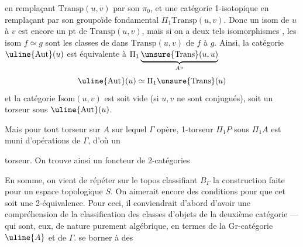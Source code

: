 
en remplaçant \(\mathrm{Transp}(u,v)\) par son \(\pi_0\), et une catégorie 1-isotopique en  remplaçant par son groupoïde fondamental \(\Pi_1\mathrm{Transp}(u,v)\). Donc un isom de \(u\) à \(v\) est encore un pt de \(\mathrm{Transp}(u,v)\), mais si on a deux tels isomorphismes , les isom \(f\simeq g\) sont les classes de  dans \(\mathrm{Transp}(u,v)\) de \(f\) à \(g\). Ainsi, la catégorie \(\uline{\mathrm{Aut}}(u)\) est équivalente à \(\Pi_1\underbrace{\unsure{\mathrm{Trans}}(u,u)}_{A^u}\) 
\[
\uline{\mathrm{Aut}}(u)\simeq\Pi_1\unsure{\mathrm{Trans}}(u)
\]
et la  catégorie \(\mathrm{Isom}(u,v)\) est soit vide (si \(u,v\) ne sont conjugués), soit un torseur sous \(\uline{\mathrm{Aut}}(u)\).

Mais pour tout torseur  sur \(A\) sur lequel \(\Gamma\) opère,   1-torseur  \(\Pi_1P\) sous \(\Pi_1A\)  est muni d'opérations de \(\Gamma\), d'où un


 torseur. On trouve ainsi un foncteur de 2-catégories

En somme, on vient de répéter sur le topos classifiant \(B_\Gamma\) la construction faite  pour un espace topologique \(S\). On aimerait encore  des conditions pour que cet   soit une 2-équivalence. Pour ceci, il conviendrait d'abord d'avoir une compréhension de la classification des classes  d'objets de la deuxième catégorie --- qui sont, eux, de nature purement algébrique, en termes de la Gr-catégorie \(\uline{A}\) et de \(\Gamma\).  se borner à des

